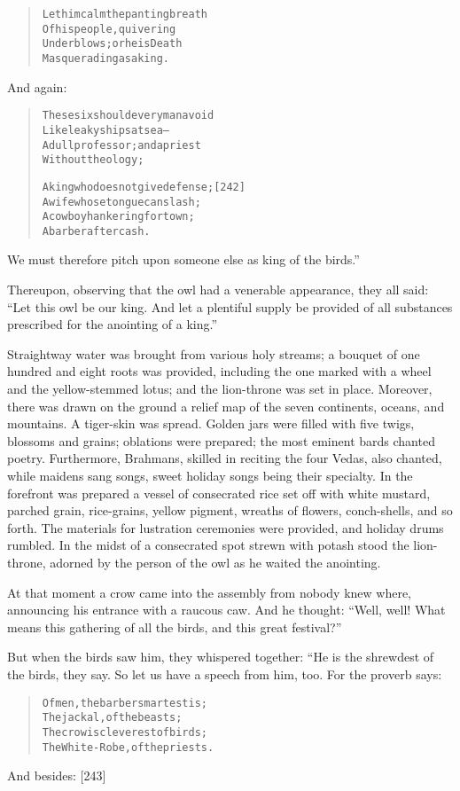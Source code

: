\documentclass[article, twoside, 14pt]{memoir}
\renewenvironment{verbatim}{%
\begin{quote}%
\vskip -10pt%
\begin{alltt}\normalfont\large}{\end{alltt}%
\end{quote}%
\vskip -10pt
} %
\begin{document}
\begin{verbatim}
Let him calm the panting breath
    Of his people, quivering
Under blows; or he is Death
    Masquerading as a king.
\end{verbatim}
And again:

\begin{verbatim}
These six should every man avoid
    Like leaky ships at sea--
A dull professor; and a priest
    Without theology;

A king who does not give defense;                       [242]
    A wife whose tongue can slash;
A cowboy hankering for town;
    A barber after cash.
\end{verbatim}
We must therefore pitch upon someone else as king of the birds.”

Thereupon, observing that the owl had a venerable appearance, they
all said:
``Let this owl be our king. And let a plentiful supply be provided of all substances prescribed for the anointing of a king.''

Straightway water was brought from various holy streams; a bouquet
of one hundred and eight roots was provided, including the one
marked with a wheel and the yellow-stemmed lotus; and the
lion-throne was set in place. Moreover, there was drawn on the
ground a relief map of the seven continents, oceans, and mountains.
A tiger-skin was spread. Golden jars were filled with five twigs,
blossoms and grains; oblations were prepared; the most eminent
bards chanted poetry. Furthermore, Brahmans, skilled in reciting
the four Vedas, also chanted, while maidens sang songs, sweet
holiday songs being their specialty. In the forefront was prepared
a vessel of consecrated rice set off with white mustard, parched
grain, rice-grains, yellow pigment, wreaths of flowers,
conch-shells, and so forth. The materials for lustration ceremonies
were provided, and holiday drums rumbled. In the midst of a
consecrated spot strewn with potash stood the lion-throne, adorned
by the person of the owl as he waited the anointing.

At that moment a crow came into the assembly from nobody knew
where, announcing his entrance with a raucous caw. And he thought:
``Well, well! What means this gathering of all the birds, and this great festival?''

But when the birds saw him, they whispered together: “He is the
shrewdest of the birds, they say. So let us have a speech from him,
too. For the proverb says:

\begin{verbatim}
Of men, the barber smartest is;
    The jackal, of the beasts;
The crow is cleverest of birds;
    The White-Robe, of the priests.
\end{verbatim}
And besides: [243]
\end{document}
